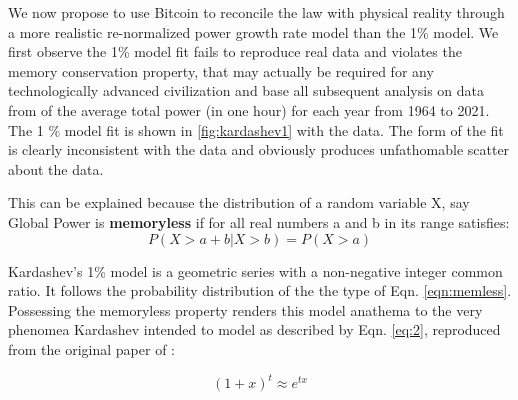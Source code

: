 \documentclass[final,5p,times,twocolumn,authoryear]{elsarticle}
\begin{document}
We now propose to use Bitcoin to reconcile the \cite{kar64} law with physical reality through a more realistic re-normalized power growth rate model than the 1\% model. We first observe the 1\% model fit fails to reproduce real data and violates the memory conservation property, that may actually be required for any technologically advanced civilization and base all subsequent analysis on data from \cite{owidenergy} of the average total power (in one hour) for each year from 1964 to 2021. The 1 \% model fit is shown in \ref{fig:kardashev1} with the data. The form of the fit is clearly inconsistent with the data and obviously produces unfathomable scatter about the data.

This can be explained because the distribution of a random variable X, say Global Power is \textbf{memoryless} if for all real numbers a and b in its range satisfies:
\begin{equation}
P(X>a +b|X>b)=P(X>a)
\label{eqn:memless}
\end{equation}

Kardashev's 1\% model is a geometric series with a non-negative integer common ratio. It follows the probability distribution of the the type of Eqn. \ref{eqn:memless}. Possessing the memoryless property renders this model anathema to the very phenomea Kardashev intended to model as described by Eqn. \ref{eq:2}, reproduced from the original paper of \cite{kar64}:

\begin{equation}
(1+x)^t \approx e^{tx}
\label{eq:2}
\end{equation}
\end{document}
